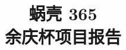 \documentclass[twocolumn]{article}
\title{%
蜗壳 365\\
\large 余庆杯项目报告}
\author{}
\date{}
\begin{document}
\twocolumn[\maketitle

\vskip\baselineskip]



% 
% 

% 
% 
\end{document}
